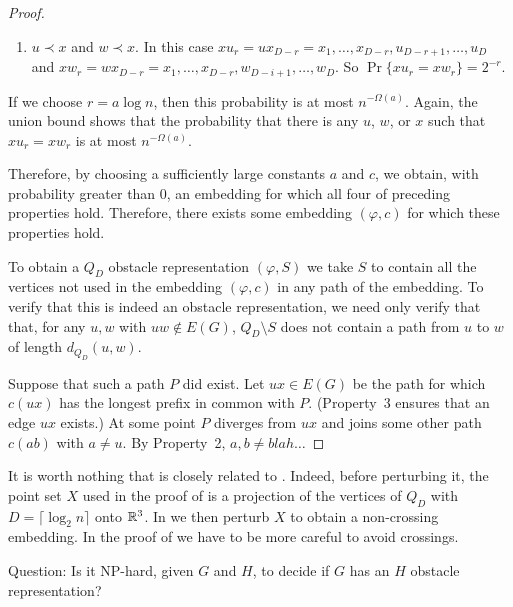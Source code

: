 \documentclass{patmorin}
\begin{document}
\begin{proof}
\begin{enumerate}
\begin{enumerate}
        \item $u\prec x$ and $w\prec x$. In this case
        $xu_r=ux_{D-r}=x_1,\ldots,x_{D-r},u_{D-r+1},\ldots,u_D$ and
        $xw_r=wx_{D-r}=x_1,\ldots,x_{D-r},w_{D-i+1},\ldots,w_D$. So
        $\Pr\{xu_r=xw_r\}=2^{-r}$.
     \end{enumerate}
     If we choose $r=a\log n$, then this probability is at most
     $n^{-\Omega(a)}$. Again, the union bound shows that the probability
     that there is any $u$, $w$, or $x$ such that $xu_r=xw_r$ is at
     most $n^{-\Omega(a)}$.
    \end{enumerate}
    Therefore, by choosing a sufficiently large constants $a$ and $c$,
    we obtain, with probability greater than 0, an embedding for which
    all four of preceding properties hold.  Therefore, there exists some
    embedding $(\varphi, c)$ for which these properties hold.

    To obtain a $Q_D$ obstacle representation $(\varphi,S)$ we take $S$
    to contain all the vertices not used in the embedding $(\varphi,
    c)$ in any path of the embedding.  To verify that this is indeed an
    obstacle representation, we need only verify that that, for any $u,w$
    with $uw\not\in E(G)$, $Q_D\setminus S$ does not contain a path from
    $u$ to $w$ of length $d_{Q_D}(u,w)$.

    Suppose that such a path $P$ did exist.  Let $ux\in E(G)$ be the path
    for which $c(ux)$ has the longest prefix in common with $P$.  (Property~3 ensures that an edge $ux$ exists.)  At some point $P$ diverges from $ux$ and joins some other path $c(ab)$ with $a\neq u$.  By Property~2, $a,b\neq blah\ldots$
\end{proof}

It is worth nothing that  is closely related to
.  Indeed, before perturbing it, the point set
$X$ used in the proof of  is a projection of
the vertices of $Q_{D}$ with $D=\lceil\log_2 n\rceil$ onto $\mathbb{R}^3$.
In  we then perturb $X$ to obtain a non-crossing
embedding.  In the proof of  we have to be more careful
to avoid crossings.

Question: Is it NP-hard, given $G$ and $H$, to decide if $G$ has an $H$ obstacle representation?



\end{document}
